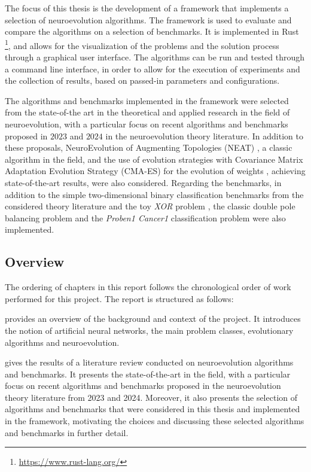 The focus of this thesis is the development of a framework that implements a selection of neuroevolution algorithms.
The framework is used to evaluate and compare the algorithms on a selection of benchmarks.
It is implemented in Rust \footnote{\url{https://www.rust-lang.org/}}, and allows for the visualization of the problems and the solution process through a graphical user interface.
The algorithms can be run and tested through a command line interface, in order to allow for the execution of experiments and the collection of results,
based on passed-in parameters and configurations.

The algorithms and benchmarks implemented in the framework were selected from the state-of-the art in the theoretical and applied research in the field of neuroevolution,
with a particular focus on recent algorithms and benchmarks proposed in $2023$ and $2024$ in the neuroevolution theory literature.
In addition to these proposals, NeuroEvolution of Augmenting Topologies (NEAT) \cite{neat}, a classic algorithm in the field, and the use of evolution strategies with
Covariance Matrix Adaptation Evolution Strategy (CMA-ES) for the evolution of weights \cite{cmaes}, achieving state-of-the-art results, were also considered.
Regarding the benchmarks, in addition to the simple two-dimensional binary classification benchmarks from the considered theory literature \cite{na,bna} and the toy \textit{XOR}
problem \cite{neat}, the classic double pole balancing problem \cite{pole_balancing} and the \textit{Proben1 Cancer1} \cite{proben} classification problem were also implemented.

\subsection{Overview}

The ordering of chapters in this report follows the chronological order of work performed for this project.
The report is structured as follows:

 provides an overview of the background and context of the project. It introduces the notion of artificial neural networks, the main problem classes,
evolutionary algorithms and neuroevolution.

 gives the results of a literature review conducted on neuroevolution algorithms and benchmarks. It presents the state-of-the-art in the field,
with a particular focus on recent algorithms and benchmarks proposed in the neuroevolution theory literature from 2023 and 2024.
Moreover, it also presents the selection of algorithms and benchmarks that were considered in this thesis and implemented in the framework, motivating the choices and
discussing these selected algorithms and benchmarks in further detail.

